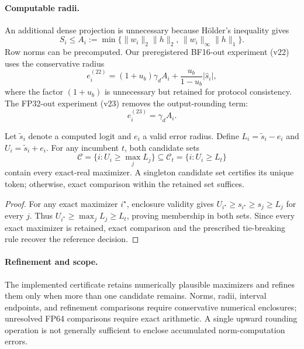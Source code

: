 \paragraph{Computable radii.}
An additional dense projection is unnecessary because H\"older's inequality gives
\begin{equation}
    S_i\leq A_i:=
    \min\{\|w_i\|_2\|h\|_2,\,
           \|w_i\|_\infty\|h\|_1\}.
    \label{eq:norm-envelope}
\end{equation}
Row norms can be precomputed. Our preregistered BF16-out experiment (v22) uses the conservative radius
\begin{equation}
    e_i^{(22)}=(1+u_b)\gamma_d A_i+
    \frac{u_b}{1-u_b}|\hat s_i|,
    \label{eq:v22-radius}
\end{equation}
where the factor $(1+u_b)$ is unnecessary but retained for protocol consistency. The FP32-out experiment (v23) removes the output-rounding term:
\begin{equation}
    e_i^{(23)}=\gamma_d A_i.
    \label{eq:v23-radius}
\end{equation}

\begin{lemma}
\label{lem:safe-candidates}
Let $\tilde s_i$ denote a computed logit and $e_i$ a valid error radius. Define $L_i=\tilde s_i-e_i$ and $U_i=\tilde s_i+e_i$. For any incumbent $t$, both candidate sets
\begin{equation}
    \mathcal C=\{i:U_i\geq\max_jL_j\}
    \subseteq
    \mathcal C_t=\{i:U_i\geq L_t\}
    \label{eq:certified-candidates}
\end{equation}
contain every exact-real maximizer. A singleton candidate set certifies its unique token; otherwise, exact comparison within the retained set suffices.
\end{lemma}

\begin{proof}
For any exact maximizer $i^\star$, enclosure validity gives $U_{i^\star}\geq s_{i^\star}\geq s_j\geq L_j$ for every $j$. Thus $U_{i^\star}\geq\max_jL_j\geq L_t$, proving membership in both sets. Since every exact maximizer is retained, exact comparison and the prescribed tie-breaking rule recover the reference decision.
\end{proof}

\paragraph{Refinement and scope.}
The implemented certificate retains numerically plausible maximizers and refines them only when more than one candidate remains. Norms, radii, interval endpoints, and refinement comparisons require conservative numerical enclosures; unresolved FP64 comparisons require exact arithmetic. A single upward rounding operation is not generally sufficient to enclose accumulated norm-computation errors.


